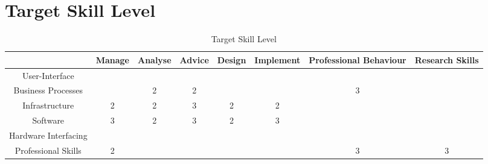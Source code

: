 
\section{Target Skill Level}
\label{sec:target}


\begin{table}[H]
	\centering
	\begin{tabular}{|c|c|c|c|c|c|c|c|}
		\hline
								& Manage 	& Analyse 	& Advice 	& Design 	& Implement 	& Professional Behaviour 	& Research Skills \\ \hline
		User-Interface 			& 			& 			& 			& 			& 	 			& 							& \\ \hline
		Business Processes 		& 			& 2			& 2 		& 			& 				& 3 						& \\ \hline
		Infrastructure 			& 2			& 2 		& 3			& 2 		& 2 			& 							& \\ \hline
		Software 				& 3 		& 2 		& 3 		& 2 		& 3 			& 							& \\ \hline
		Hardware Interfacing 	& 			& 			& 			& 			& 				& 							& \\ \hline
		Professional Skills 	& 2			& 			& 			& 			& 				& 3 						& 3 \\ \hline          
	\end{tabular}
	\caption{Target Skill Level}
	\label{targetskills}
\end{table}